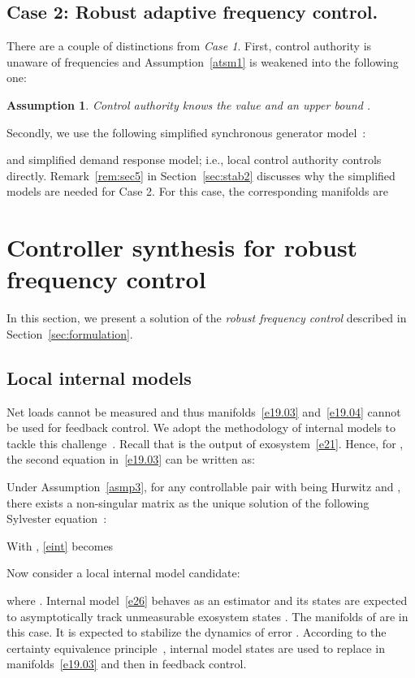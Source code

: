 \documentclass[journal]{IEEEtran}
\newtheorem{assumption}{\bf Assumption}[section]
\begin{document}
\subsection{Case 2: Robust adaptive frequency control.}\label{sec:formulation2}
There are a couple of distinctions from \emph{Case 1}.
First, control authority  is unaware of frequencies  and Assumption~\ref{atsm1} is weakened into the following one:
\begin{assumption}
Control authority  knows the value  and an upper bound .
\label{atsm3}
\end{assumption}
Secondly, we use the following simplified synchronous generator model~\cite{Wood:1996}:

and simplified demand response model; i.e., local control authority  controls  directly.
Remark~\ref{rem:sec5} in Section~\ref{sec:stab2} discusses why the simplified models are needed for Case 2.
For this case, the corresponding manifolds are


\section{Controller synthesis for robust frequency control}\label{sec:sol1}
In this section, we present a solution of the \emph{robust frequency control} described in Section~\ref{sec:formulation}.

\subsection{Local internal models}\label{sec:internal}
Net loads  cannot be measured and thus manifolds~\eqref{e19.03} and~\eqref{e19.04} cannot be used for feedback control. We adopt the methodology of internal models to tackle this challenge~\cite{isidori1990output,francis1976internal}.
Recall that  is the output of exosystem~\eqref{e21}. Hence, for , the second equation in~\eqref{e19.03} can be written as:

Under Assumption~\ref{asmp3}, for any controllable pair  with  being Hurwitz and , there exists a non-singular matrix  as the unique solution of the following Sylvester equation~\cite{bhatia1997and}:

With , \eqref{eint} becomes

Now consider a local internal model candidate:

where .
Internal model~\eqref{e26} behaves as an estimator and its states  are expected to asymptotically track unmeasurable exosystem states . The manifolds of  are  in this case.
It is expected to stabilize the dynamics of error .
According to the certainty equivalence principle~\cite{whittle1986risk}, internal model states  are used to replace  in manifolds~\eqref{e19.03} and then in feedback control.
\end{document}
